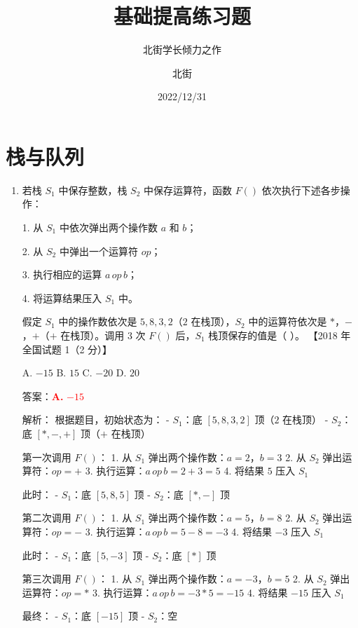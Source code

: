 \documentclass[lang=cn,newtx,10pt,scheme=chinese]{../../../elegantbook}
\title{基础提高练习题}
\subtitle{北街学长倾力之作}
\author{北街}
\date{2022/12/31}
\begin{document}
\maketitle
\frontmatter

\tableofcontents

\mainmatter


\chapter{栈与队列}
\begin{enumerate}
    \item 若栈 $S_1$ 中保存整数，栈 $S_2$ 中保存运算符，函数 $F()$ 依次执行下述各步操作：  
    
    1. 从 $S_1$ 中依次弹出两个操作数 $a$ 和 $b$；  

    2. 从 $S_2$ 中弹出一个运算符 $op$；  

    3. 执行相应的运算 $a \, op \, b$；

    4. 将运算结果压入 $S_1$ 中。  

    假定 $S_1$ 中的操作数依次是 $5, 8, 3, 2$（$2$ 在栈顶），$S_2$ 中的运算符依次是 $*$，$-$，$+$（$+$ 在栈顶）。调用 3 次 $F()$ 后，$S_1$ 栈顶保存的值是（ ）。  
    【2018 年全国试题 1（2 分）】  
    
    A. $-15$ \quad B. $15$ \quad C. $-20$ \quad D. $20$  

    答案：\textcolor{red}{\textbf{A.} $-15$}

    解析：
    根据题目，初始状态为：
    - $S_1$：底 $[5, 8, 3, 2]$ 顶（$2$ 在栈顶）
    - $S_2$：底 $[*, -, +]$ 顶（$+$ 在栈顶）

    第一次调用 $F()$：
    1. 从 $S_1$ 弹出两个操作数：$a=2$，$b=3$
    2. 从 $S_2$ 弹出运算符：$op=+$
    3. 执行运算：$a \, op \, b = 2 + 3 = 5$
    4. 将结果 $5$ 压入 $S_1$

    此时：
    - $S_1$：底 $[5, 8, 5]$ 顶
    - $S_2$：底 $[*, -]$ 顶

    第二次调用 $F()$：
    1. 从 $S_1$ 弹出两个操作数：$a=5$，$b=8$
    2. 从 $S_2$ 弹出运算符：$op=-$
    3. 执行运算：$a \, op \, b = 5 - 8 = -3$
    4. 将结果 $-3$ 压入 $S_1$

    此时：
    - $S_1$：底 $[5, -3]$ 顶
    - $S_2$：底 $[*]$ 顶

    第三次调用 $F()$：
    1. 从 $S_1$ 弹出两个操作数：$a=-3$，$b=5$
    2. 从 $S_2$ 弹出运算符：$op=*$
    3. 执行运算：$a \, op \, b = -3 * 5 = -15$
    4. 将结果 $-15$ 压入 $S_1$

    最终：
    - $S_1$：底 $[-15]$ 顶
    - $S_2$：空


\end{enumerate}
\end{document}
